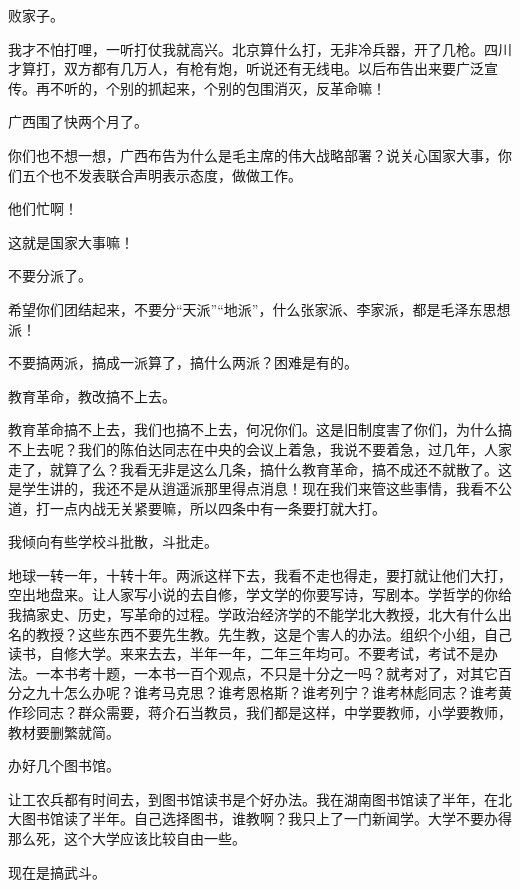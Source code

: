 败家子。

我才不怕打哩，一听打仗我就高兴。北京算什么打，无非冷兵器，开了几枪。四川才算打，双方都有几万人，有枪有炮，听说还有无线电。以后布告出来要广泛宣传。再不听的，个别的抓起来，个别的包围消灭，反革命嘛！

广西围了快两个月了。

你们也不想一想，广西布告为什么是毛主席的伟大战略部署？说关心国家大事，你们五个也不发表联合声明表示态度，做做工作。

他们忙啊！

这就是国家大事嘛！

不要分派了。

希望你们团结起来，不要分“天派”“地派”，什么张家派、李家派，都是毛泽东思想派！

不要搞两派，搞成一派算了，搞什么两派？困难是有的。

教育革命，教改搞不上去。

教育革命搞不上去，我们也搞不上去，何况你们。这是旧制度害了你们，为什么搞不上去呢？我们的陈伯达同志在中央的会议上着急，我说不要着急，过几年，人家走了，就算了么？我看无非是这么几条，搞什么教育革命，搞不成还不就散了。这是学生讲的，我还不是从逍遥派那里得点消息！现在我们来管这些事情，我看不公道，打一点内战无关紧要嘛，所以四条中有一条要打就大打。

我倾向有些学校斗批散，斗批走。

地球一转一年，十转十年。两派这样下去，我看不走也得走，要打就让他们大打，空出地盘来。让人家写小说的去自修，学文学的你要写诗，写剧本。学哲学的你给我搞家史、历史，写革命的过程。学政治经济学的不能学北大教授，北大有什么出名的教授？这些东西不要先生教。先生教，这是个害人的办法。组织个小组，自己读书，自修大学。来来去去，半年一年，二年三年均可。不要考试，考试不是办法。一本书考十题，一本书一百个观点，不只是十分之一吗？就考对了，对其它百分之九十怎么办呢？谁考马克思？谁考恩格斯？谁考列宁？谁考林彪同志？谁考黄作珍同志？群众需要，蒋介石当教员，我们都是这样，中学要教师，小学要教师，教材要删繁就简。

办好几个图书馆。

让工农兵都有时间去，到图书馆读书是个好办法。我在湖南图书馆读了半年，在北大图书馆读了半年。自己选择图书，谁教啊？我只上了一门新闻学。大学不要办得那么死，这个大学应该比较自由一些。

现在是搞武斗。

